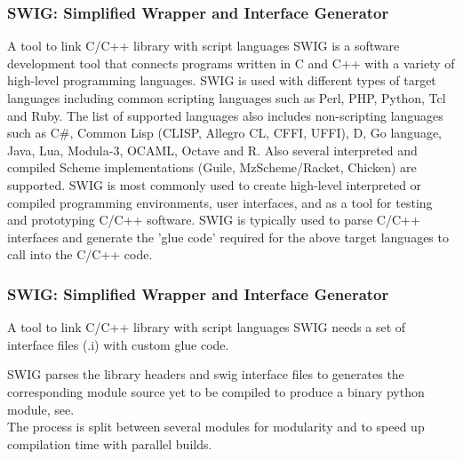 \documentclass[8pt]{beamer}
\begin{document}
\begin{frame}
  \frametitle{SWIG: Simplified Wrapper and Interface Generator}
  \begin{block}{A tool to link C/C++ library with script languages}
    SWIG is a software development tool that connects programs written in C and C++ with a variety of high-level programming languages. SWIG is used with different types of target languages including common scripting languages such as Perl, PHP, Python, Tcl and Ruby. The list of supported languages also includes non-scripting languages such as C\#, Common Lisp (CLISP, Allegro CL, CFFI, UFFI), D, Go language, Java, Lua, Modula-3, OCAML, Octave and R. Also several interpreted and compiled Scheme implementations (Guile, MzScheme/Racket, Chicken) are supported. SWIG is most commonly used to create high-level interpreted or compiled programming environments, user interfaces, and as a tool for testing and prototyping C/C++ software. SWIG is typically used to parse C/C++ interfaces and generate the 'glue code' required for the above target languages to call into the C/C++ code.
  \end{block}
\end{frame}

\begin{frame}
  \frametitle{SWIG: Simplified Wrapper and Interface Generator}
  \begin{block}{A tool to link C/C++ library with script languages}
  SWIG needs a set of interface files (.i) with custom glue code.
  
    SWIG parses the library headers and swig interface files to
  generates the corresponding module source yet to be compiled to
  produce a binary python module, see.\\
  The process is split between several modules for modularity and to speed up compilation
  time with parallel builds.
  \end{block}
  \centering {}
\end{frame}
\end{document}
